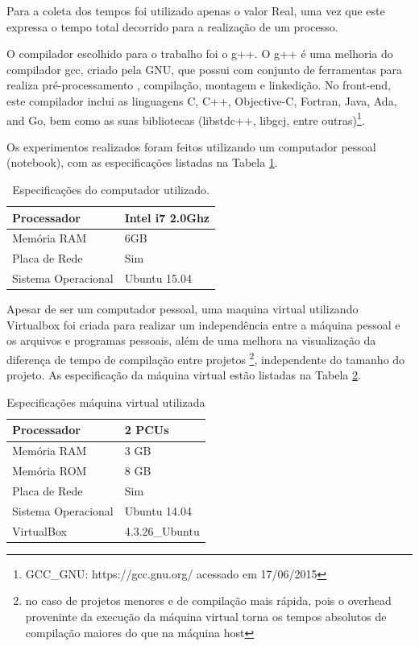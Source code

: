 Para a coleta dos tempos foi utilizado apenas o valor Real, uma vez que este
 expressa o tempo total decorrido para a realização de um processo.

O compilador escolhido para o trabalho foi o g++. O g++ é uma melhoria do
 compilador gcc, criado pela GNU, que possui com conjunto de ferramentas
 para realiza pré-processamento , compilação, montagem e linkedição.
 No front-end,  este compilador inclui as linguagens C, C++, Objective-C,
 Fortran, Java, Ada, and Go, bem como as suas bibliotecas  (libstdc++,
 libgcj, entre outras)\footnote{GCC\_GNU: https://gcc.gnu.org/ acessado
 em 17/06/2015}.


Os experimentos realizados foram feitos utilizando um computador pessoal
 (notebook), com  as especificações  listadas na Tabela 
\ref{tab:especificacoes_hardware}.


\begin{table}[h]
\centering
\caption{Especificações do computador utilizado.}
\label{tab:especificacoes_hardware}
\begin{tabular}{|l|l|}
	\hline
	Processador         & Intel i7 2.0Ghz \\
	\hline
	Memória RAM         & 6GB             \\
	\hline
	Placa de Rede       & Sim             \\
	\hline
	Sistema Operacional & Ubuntu 15.04 \\
	\hline
\end{tabular}
\end{table}


Apesar de ser um computador pessoal, uma maquina virtual utilizando Virtualbox
 foi criada para realizar um independência entre a máquina pessoal e os
 arquivos e programas pessoais, além de uma melhora  na visualização da
 diferença de tempo de compilação entre projetos
 \footnote{no caso de projetos menores e de compilação mais rápida, pois o 
overhead proveninte da execução da máquina virtual torna os tempos absolutos
 de compilação maiores do que na máquina host}, independente do tamanho do
 projeto. As especificação da máquina virtual  estão listadas na Tabela
 \ref{tab:especificacoes_vm}.

\begin{table}[h]
	\centering
	\caption{Especificações máquina virtual utilizada}
	\label{tab:especificacoes_vm}
		\begin{tabular}{|l|l|}
			\hline
			Processador & 2 PCUs \\
			\hline
			Memória RAM & 3 GB \\
			\hline
			Memória ROM & 8 GB \\
			\hline
			Placa de Rede & Sim \\
			\hline
			Sistema Operacional & Ubuntu 14.04 \\
			\hline
			VirtualBox & 4.3.26\_Ubuntu \\
			\hline
		\end{tabular}
\end{table}


